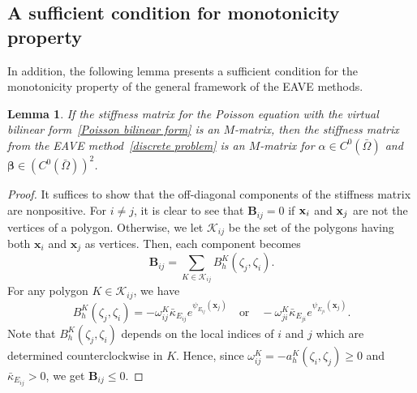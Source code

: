 \documentclass[a4paper]{article}
\theoremstyle{plain}
\newtheorem{lemma}[theorem]{Lemma}
\theoremstyle{definition}
\numberwithin{equation}{section}
\newcommand{\bx}{{\bf x}}
\begin{document}
\subsection{A sufficient condition for monotonicity property}
In addition, the following lemma presents a sufficient condition for the monotonicity property of the general framework of the EAVE methods.
\begin{lemma}\label{lemma: eave_monotone}
If the stiffness matrix for the Poisson equation with the virtual bilinear form~\eqref{Poisson bilinear form} is an $M$-matrix, then the stiffness matrix from the EAVE method~\eqref{discrete problem} is an $M$-matrix for $\alpha\in C^0(\bar{\Omega})$ and $\bm{\beta}\in \left(C^0(\bar{\Omega})\right)^2$.
\end{lemma}
\begin{proof}
It suffices to show that the off-diagonal components of the stiffness matrix are nonpositive.
For $i\not=j$, it is clear to see that $\mathbf{B}_{ij}=0$ if $\bx_i$ and $\bx_j$ are not the vertices of a polygon.
Otherwise, we let $\mathcal{K}_{ij}$ be the set of the polygons having both $\mathbf{x}_i$ and $\mathbf{x}_j$ as vertices.
Then, each component becomes
\begin{equation*}
\mathbf{B}_{ij}=\sum_{K\in\mathcal{K}_{ij}}B_h^{K}(\zeta_j,\zeta_i).
\end{equation*}
For any polygon $K\in\mathcal{K}_{ij}$, we have
\begin{equation*}
B_h^K(\zeta_j,\zeta_i) =-\omega_{ij}^{K}\bar{\kappa}_{E_{ij}}e^{\psi_{E_{ij}}(\mathbf{x}_j)}\quad\text{or}\quad -\omega_{ji}^{K}\bar{\kappa}_{E_{ji}}e^{\psi_{E_{ji}}(\mathbf{x}_j)}.
\end{equation*}
Note that $B_h^{K}(\zeta_j,\zeta_i)$ depends on the local indices of $i$ and $j$ which are determined counterclockwise in $K$.
Hence, since $\omega_{ij}^K= -a^K_h(\zeta_i,\zeta_j)\geq 0$ and $\bar{\kappa}_{E_{ij}}>0$, we get $\mathbf{B}_{ij}\leq 0$.
\end{proof}



\end{document}
